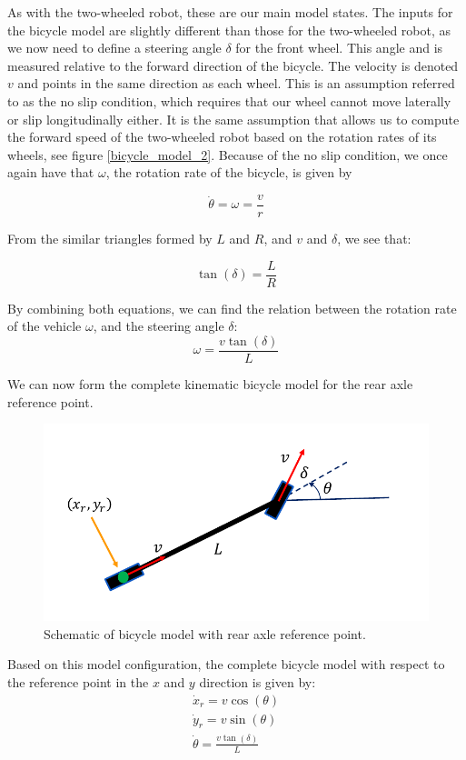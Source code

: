 As with the two-wheeled robot, these are our main model states. The inputs for the bicycle model are slightly different than those for the two-wheeled robot, as we now need to define a steering angle $\delta$ for the front wheel. This angle and is measured relative to the forward direction of the bicycle. The velocity is denoted $v$ and points in the same direction as each wheel. 
This is an assumption referred to as the no slip condition, which requires that our wheel cannot move laterally or slip longitudinally either. 
It is the same assumption that allows us to compute the forward speed of the two-wheeled robot based on the rotation rates of its wheels, see figure \ref{bicycle_model_2}. 
Because of the no slip condition, we once again have that $\omega$, the rotation rate of the bicycle, is given by

\begin{equation}
\dot{\theta} = \omega = \frac{v}{r}
\end{equation}


From the similar triangles formed by $L$ and $R$, and $v$ and $\delta$, we see that:

\begin{equation}
\tan(\delta) = \frac{L}{R}
\end{equation}


By combining both equations, we can find the relation between the rotation rate of the vehicle $\omega$, and the steering angle $\delta$:
\begin{equation}
\omega = \frac{v\tan(\delta)}{L}
\end{equation}

We can now form the complete kinematic bicycle model for the rear axle reference point. 
\begin{figure}[!htb]
\begin{center}
\includegraphics[scale=0.290]{img/bicycle_model/bicycle_model_3.jpeg}
\end{center}
\caption{Schematic of bicycle model with rear axle reference point.}
\label{bicycle_model_3}
\end{figure}
Based on this model configuration, the complete bicycle model with respect to the  reference point in the $x$ and $y$ direction is given by:
\begin{eqnarray}
\dot{x}_r = v\cos(\theta) \\
\dot{y}_r = v\sin(\theta) \\
\dot{\theta} = \frac{v\tan(\delta)}{L}
\end{eqnarray}


